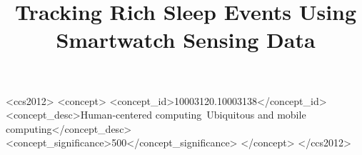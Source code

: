 \documentclass[acmlarge]{acmart}
\begin{document}
\title{Tracking Rich Sleep Events Using Smartwatch Sensing Data}

%




\begin{CCSXML}
	<ccs2012>
	<concept>
	<concept_id>10003120.10003138</concept_id>
	<concept_desc>Human-centered computing~Ubiquitous and mobile computing</concept_desc>
	<concept_significance>500</concept_significance>
	</concept>
	</ccs2012>
\end{CCSXML}




\maketitle





%
%









\end{document}
